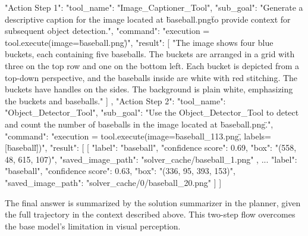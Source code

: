     \begin{answerbox}
    \begin{answercodebox}
    "Action Step 1": {
        "tool_name": "Image_Captioner_Tool",
        "sub_goal": "Generate a descriptive caption for the image located at \"baseball.png\" to provide context for subsequent object detection.",
        "command": "execution = tool.execute(image=\"baseball.png\")",
        "result": [
            "The image shows four blue buckets, each containing five baseballs. The buckets are arranged in a grid with three on the top row and one on the bottom left. Each bucket is depicted from a top-down perspective, and the baseballs inside are white with red stitching. The buckets have handles on the sides. The background is plain white, emphasizing the buckets and baseballs."
        ]
    },
    "Action Step 2": {
        "tool_name": "Object_Detector_Tool",
        "sub_goal": "Use the Object_Detector_Tool to detect and count the number of baseballs in the image located at \"baseball.png\".",
        "command": "execution = tool.execute(image=\"baseball_113.png\", labels=[\"baseball\"])",
        "result": [
            [
                {
                    "label": "baseball",
                    "confidence score": 0.69,
                    "box": "(558, 48, 615, 107)",
                    "saved_image_path": "solver_cache/baseball_1.png"
                },
                ...
                {
                    "label": "baseball",
                    "confidence score": 0.63,
                    "box": "(336, 95, 393, 153)",
                    "saved_image_path": "solver_cache/0/baseball_20.png"
                }
            ]
        ]
    }
    \end{answercodebox}
    \end{answerbox}
    
    The final answer is summarized by the solution summarizer in the planner, given the full trajectory in the context described above. This two-step flow overcomes the base \gpt model’s limitation in visual perception.
    
